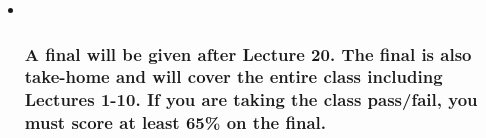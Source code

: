 \documentclass[11pt]{article}
\begin{document}
\begin{itemize}
\begin{itemize}
    \begin{itemize}
    \item ~
      \subsubsection{A final will be given after Lecture 20. The final
      is also take-home and will cover the entire class including
      Lectures 1-10. If you are taking the class pass/fail, you must
      score at least 65\% on the
      final.}\label{a-final-will-be-given-after-lecture-20.-the-final-is-also-take-home-and-will-cover-the-entire-class-including-lectures-1-10.-if-you-are-taking-the-class-passfail-you-must-score-at-least-65-on-the-final.}
    \end{itemize}
  \end{itemize}
\end{itemize}
\end{document}
